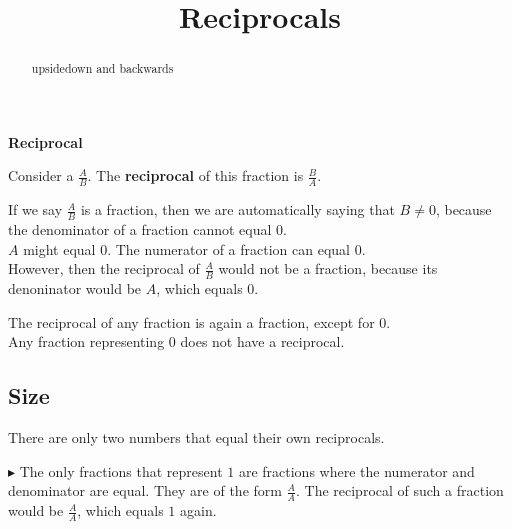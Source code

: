 \documentclass{ximera}
\title{Reciprocals}
\begin{document}
\begin{abstract}
upsidedown and backwards
\end{abstract}
\maketitle







\begin{definition}  \textbf{\textcolor{green!50!black}{Reciprocal}}


Consider a $\frac{A}{B}$.  The \textbf{reciprocal} of this fraction is $\frac{B}{A}$.


\end{definition}



If we say $\frac{A}{B}$ is a fraction, then we are automatically saying that $B \ne 0$, because the denominator of a fraction cannot equal $0$. \\

$A$ might equal $0$.  The numerator of a fraction can equal $0$. \\


However, then the reciprocal of $\frac{A}{B}$ would not be a fraction, because its denoninator would be $A$, which equals $0$.



\begin{warning}

The reciprocal of any fraction is again a fraction, except for $0$. \\

Any fraction representing $0$ does not have a reciprocal.


\end{warning}



\subsection*{Size}



There are only two numbers that equal their own reciprocals.



$\blacktriangleright$ The only fractions that represent $1$ are fractions where the numerator and denominator are equal.  They are of the form $\frac{A}{A}$.  The reciprocal of such a fraction would be $\frac{A}{A}$, which equals $1$ again.
\end{document}
